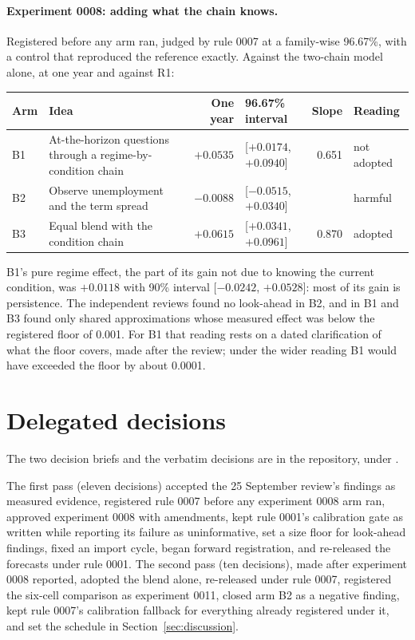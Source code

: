 \documentclass[11pt]{article}
\begin{document}
\paragraph{Experiment 0008: adding what the chain knows.} Registered before any arm ran, judged by rule
0007 at a family-wise 96.67\%, with a control that reproduced the reference exactly. Against the
two-chain model alone, at one year and against R1:

\begin{center}
\small
\begin{tabularx}{\linewidth}{@{}lXrlrl@{}}
\toprule
Arm & Idea & One year & 96.67\% interval & Slope & Reading \\
\midrule
B1 & At-the-horizon questions through a regime-by-condition chain & $+0.0535$ & [$+0.0174$, $+0.0940$] & 0.651 & not adopted \\
B2 & Observe unemployment and the term spread & $-0.0088$ & [$-0.0515$, $+0.0340$] & & harmful \\
B3 & Equal blend with the condition chain & $+0.0615$ & [$+0.0341$, $+0.0961$] & 0.870 & adopted \\
\bottomrule
\end{tabularx}
\end{center}

\noindent B1's pure regime effect, the part of its gain not due to knowing the current condition, was
$+0.0118$ with 90\% interval [$-0.0242$, $+0.0528$]: most of its gain is persistence. The independent
reviews found no look-ahead in B2, and in B1 and B3 found only shared approximations whose measured
effect was below the registered floor of 0.001. For B1 that reading rests on a dated clarification of
what the floor covers, made after the review; under the wider reading B1 would have exceeded the floor
by about 0.0001.

\section{Delegated decisions}\label{app:delegated}

The two decision briefs and the verbatim decisions are in the repository, under
.

The first pass (eleven decisions) accepted the 25
September review's findings as measured evidence, registered rule 0007 before any experiment 0008 arm
ran, approved experiment 0008 with amendments, kept rule 0001's calibration gate as written while
reporting its failure as uninformative, set a size floor for look-ahead findings, fixed an import cycle,
began forward registration, and re-released the forecasts under rule 0001. The second pass (ten
decisions), made after experiment 0008 reported, adopted the blend alone, re-released under rule 0007,
registered the six-cell comparison as experiment 0011, closed arm B2 as a negative finding, kept rule
0007's calibration fallback for everything already registered under it, and set the schedule in
Section~\ref{sec:discussion}.
\end{document}
